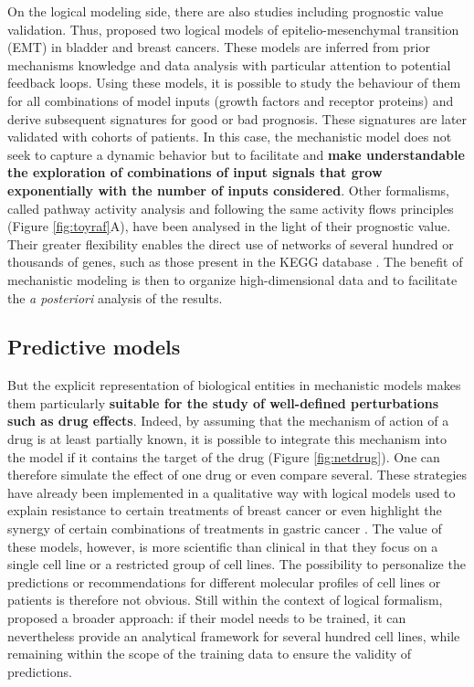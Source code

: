 \documentclass[a4paper,12pt,twoside,onecolumn,openright,final,oldfontcommands]{memoir}
\begin{document}
On the logical modeling side, there are also studies including
prognostic value validation. Thus, \citet{khan2017unraveling} proposed
two logical models of epitelio-mesenchymal transition (EMT) in bladder
and breast cancers. These models are inferred from prior mechanisms
knowledge and data analysis with particular attention to potential
feedback loops. Using these models, it is possible to study the
behaviour of them for all combinations of model inputs (growth factors
and receptor proteins) and derive subsequent signatures for good or bad
prognosis. These signatures are later validated with cohorts of
patients. In this case, the mechanistic model does not seek to capture a
dynamic behavior but to facilitate and \textbf{make understandable the
exploration of combinations of input signals that grow exponentially
with the number of inputs considered}. Other formalisms, called pathway
activity analysis and following the same activity flows principles
(Figure \ref{fig:toyraf}A), have been analysed in the light of their
prognostic value. Their greater flexibility enables the direct use of
networks of several hundred or thousands of genes, such as those present
in the KEGG database \citep{kanehisa2012kegg}. The benefit of
mechanistic modeling is then to organize high-dimensional data and to
facilitate the \emph{a posteriori} analysis of the results.

\subsection{Predictive models}\label{predictive-models}

But the explicit representation of biological entities in mechanistic
models makes them particularly \textbf{suitable for the study of
well-defined perturbations such as drug effects}. Indeed, by assuming
that the mechanism of action of a drug is at least partially known, it
is possible to integrate this mechanism into the model if it contains
the target of the drug (Figure \ref{fig:netdrug}). One can therefore
simulate the effect of one drug or even compare several. These
strategies have already been implemented in a qualitative way with
logical models used to explain resistance to certain treatments of
breast cancer \citep{zanudo2017network} or even highlight the synergy of
certain combinations of treatments in gastric cancer
\citep{flobak2015discovery}. The value of these models, however, is more
scientific than clinical in that they focus on a single cell line or a
restricted group of cell lines. The possibility to personalize the
predictions or recommendations for different molecular profiles of cell
lines or patients is therefore not obvious. Still within the context of
logical formalism, \citet{knijnenburg2016logic} proposed a broader
approach: if their model needs to be trained, it can nevertheless
provide an analytical framework for several hundred cell lines, while
remaining within the scope of the training data to ensure the validity
of predictions.
\end{document}
